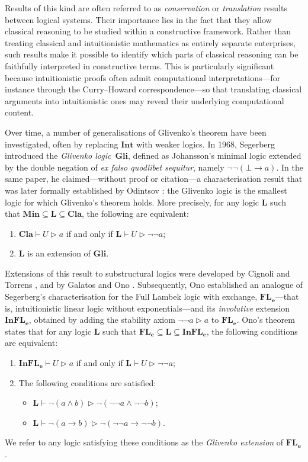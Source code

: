 \documentclass[runningheads]{llncs}
\renewcommand{\L}{\mathbf{L}}
\newcommand{\FLe}{\mathbf{FL_e}}
\newcommand{\InFLe}{\mathbf{InFL_e}}
\newcommand{\Min}{\mathbf{Min}}
\newcommand{\Cl}{\mathbf{Cla}}
\newcommand{\Gl}{\mathbf{Gli}}
\newcommand{\Int}{\mathbf{Int}}
\begin{document}
Results of this kind are often referred to as \emph{conservation} or \emph{translation} results between logical systems. Their importance lies in the fact that they allow classical reasoning to be studied within a constructive framework. Rather than treating classical and intuitionistic mathematics as entirely separate enterprises, such results make it possible to identify which parts of classical reasoning can be faithfully interpreted in constructive terms. This is particularly significant because intuitionistic proofs often admit computational interpretations---for instance through the Curry--Howard correspondence---so that translating classical arguments into intuitionistic ones may reveal their underlying computational content.

Over time, a number of generalisations of Glivenko's theorem have been investigated, often by replacing $\Int$ with weaker logics. In 1968, Segerberg \cite{Segerberg1968-SEGPLR} introduced the \emph{Glivenko logic}~$\Gl$, defined as Johansson's minimal logic extended by the double negation of \emph{ex falso quodlibet sequitur}, namely $\neg\neg(\bot \to a)$. In the same paper, he claimed---without proof or citation---a characterisation result that was later formally established by Odintsov \cite{Odintsov02,Odintsov2004-ODINEO-2}: the Glivenko logic is the smallest logic for which Glivenko's theorem holds. More precisely, for any logic $\L$ such that $\Min \subseteq \L \subseteq \Cl$, the following are equivalent:
\begin{enumerate}
	\item $\Cl \vdash U \rhd a$ if and only if $\L \vdash U \rhd \neg\neg a$;
	\item $\L$ is an extension of $\Gl$.
\end{enumerate}

Extensions of this result to substructural logics were developed by Cignoli and Torrens \cite{Cignoli2003-CIGHBF,CignoliTorrens}, and by Galatos and Ono \cite{GO:glitsl,ResLat}. Subsequently, Ono \cite{ono:gli} established an analogue of Segerberg's characterisation for the Full Lambek logic with exchange, $\FLe$---that is, intuitionistic linear logic without exponentials---and its \emph{involutive} extension $\InFLe$, obtained by adding the stability axiom $\neg\neg a \rhd a$ to $\FLe$. Ono's theorem states that for any logic $\L$ such that $\FLe \subseteq \L \subseteq \InFLe$, the following conditions are equivalent:
\begin{enumerate}
	\item $\InFLe \vdash U \rhd a$ if and only if $\L \vdash U \rhd \neg\neg a$;
	\item The following conditions are satisfied:
	\begin{itemize}
		\item $\L \vdash \neg(a \wedge b) \rhd \neg(\neg\neg a \wedge \neg\neg b)$;
		\item $\L \vdash \neg(a \to b) \rhd \neg(\neg\neg a \to \neg\neg b)$.
	\end{itemize}
\end{enumerate}
We refer to any logic satisfying these conditions as the \emph{Glivenko extension} of $\FLe$.
\end{document}
